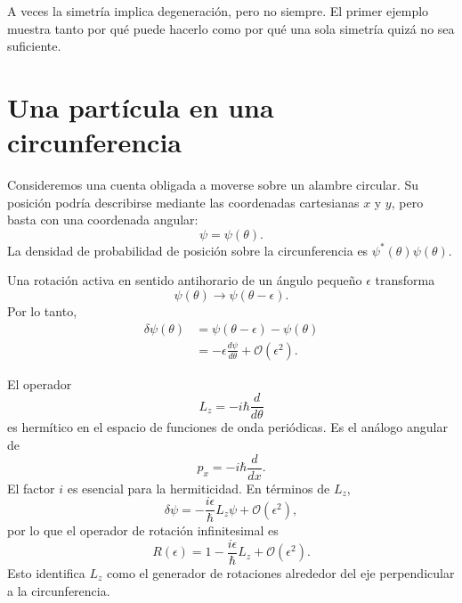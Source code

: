 A veces la simetría implica degeneración, pero no siempre. El primer ejemplo muestra tanto por qué puede hacerlo como por qué una sola simetría quizá no sea suficiente.

\section{Una partícula en una circunferencia}

Consideremos una cuenta obligada a moverse sobre un alambre circular. Su posición podría describirse mediante las coordenadas cartesianas \(x\) y \(y\), pero basta con una coordenada angular:
\begin{equation}
\psi=\psi(\theta).
\end{equation}
La densidad de probabilidad de posición sobre la circunferencia es \(\psi^*(\theta)\psi(\theta)\).

Una rotación activa en sentido antihorario de un ángulo pequeño \(\epsilon\) transforma
\begin{equation}
\psi(\theta)\longrightarrow\psi(\theta-\epsilon).
\end{equation}
Por lo tanto,
\begin{align}
\delta\psi(\theta)
&=\psi(\theta-\epsilon)-\psi(\theta)\\
&=-\epsilon\frac{d\psi}{d\theta}
+\mathcal O(\epsilon^2).
\end{align}

El operador
\begin{equation}
L_z=-i\hbar\frac{d}{d\theta}
\end{equation}
es hermítico en el espacio de funciones de onda periódicas. Es el análogo angular de
\begin{equation}
p_x=-i\hbar\frac{d}{dx}.
\end{equation}
El factor \(i\) es esencial para la hermiticidad. En términos de \(L_z\),
\begin{equation}
\delta\psi
=-\frac{i\epsilon}{\hbar}L_z\psi
+\mathcal O(\epsilon^2),
\end{equation}
por lo que el operador de rotación infinitesimal es
\begin{equation}
R(\epsilon)
=1-\frac{i\epsilon}{\hbar}L_z
+\mathcal O(\epsilon^2).
\end{equation}
Esto identifica \(L_z\) como el generador de rotaciones alrededor del eje perpendicular a la circunferencia.

\begin{classroomqa}
\end{classroomqa}

